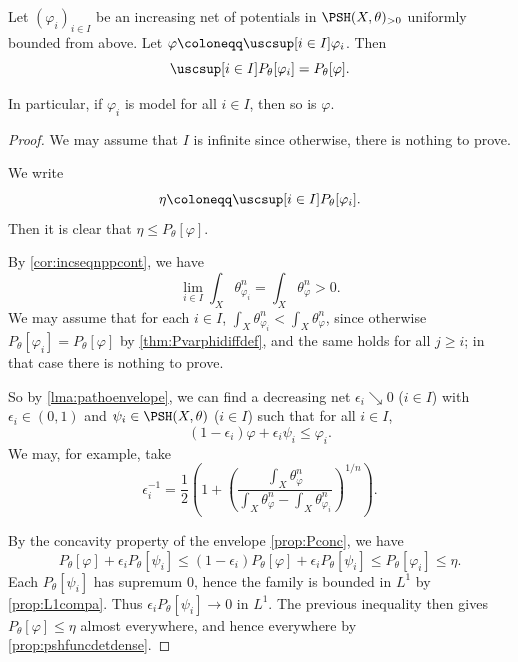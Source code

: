 \begin{proposition}\label{prop:incnetmodel}
    Let $(\varphi_i)_{i\in I}$ be an increasing net of potentials in $\PSH(X,\theta)_{>0}$ uniformly bounded from above. Let $\varphi\coloneqq \uscsup[i\in I]\varphi_i$. Then
    \[
    \uscsup[i\in I] P_{\theta}[\varphi_i]=P_{\theta}[\varphi].
    \]

    In particular, if $\varphi_i$ is model for all $i\in I$, then so is $\varphi$.
\end{proposition}
\begin{proof}
We may assume that $I$ is infinite since otherwise, there is nothing to prove.

    We write
    \[
    \eta\coloneqq \uscsup[i\in I] P_{\theta}[\varphi_i].
    \]
    Then it is clear that $\eta\leq P_{\theta}[\varphi]$.

    By \cref{cor:incseqnppcont}, we have
    \[
        \lim_{i\in I} \int_X\theta_{\varphi_i}^n=\int_X\theta_{\varphi}^n>0.
    \]
    We may assume that for each $i\in I$, $\int_X\theta_{\varphi_i}^n<\int_X\theta_{\varphi}^n$, since otherwise $P_{\theta}[\varphi_i]=P_{\theta}[\varphi]$ by \cref{thm:Pvarphidiffdef}, and the same holds for all $j\geq i$; in that case there is nothing to prove.

    So by \cref{lma:pathoenvelope}, we can find a decreasing net $\epsilon_i\searrow 0$ ($i\in I$) with $\epsilon_i\in (0,1)$ and $\psi_i\in \PSH(X,\theta)$ ($i\in I$) such that for all $i\in I$,
    \[
        (1-\epsilon_i) \varphi+\epsilon_i\psi_i\leq \varphi_i.
    \]
    We may, for example, take
    \begin{equation}\label{eq:epsilon_inetchoice}
        \epsilon_i^{-1}=\frac{1}{2}\left( 1+\left(\frac{\int_X \theta_{\varphi}^n}{\int_X \theta_{\varphi}^n-\int_X \theta_{\varphi_i}^n}\right)^{1/n} \right).
    \end{equation}


    By the concavity property of the envelope \cref{prop:Pconc}, we have
    \[
        P_{\theta}[\varphi]+\epsilon_i P_{\theta}[\psi_i]\leq (1-\epsilon_i) P_{\theta}[\varphi]+\epsilon_i P_{\theta}[\psi_i]\leq P_{\theta}[\varphi_i]\leq\eta.
    \]
    Each $P_{\theta}[\psi_i]$ has supremum $0$, hence the family is bounded in $L^1$ by \cref{prop:L1compa}. Thus $\epsilon_iP_{\theta}[\psi_i]\to 0$ in $L^1$. The previous inequality then gives $P_{\theta}[\varphi]\leq \eta$ almost everywhere, and hence everywhere by \cref{prop:pshfuncdetdense}.
\end{proof}




